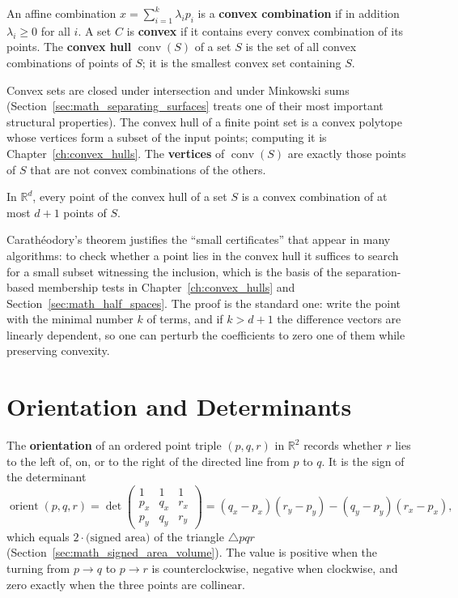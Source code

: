 \begin{definition}\label{def:math_convex_hull}
  An affine combination $x = \sum_{i=1}^k \lambda_i p_i$ is a
  \textbf{convex combination} if in addition $\lambda_i \ge 0$ for all $i$.
  A set $C$ is \textbf{convex} if it contains every convex combination of its
  points. The \textbf{convex hull} $\operatorname{conv}(S)$ of a set $S$ is
  the set of all convex combinations of points of $S$; it is the smallest
  convex set containing $S$.
\end{definition}

Convex sets are closed under intersection and under Minkowski sums
(Section~\ref{sec:math_separating_surfaces} treats one of their most
important structural properties). The convex hull of a finite point set is a
convex polytope whose vertices form a subset of the input points; computing
it is Chapter~\ref{ch:convex_hulls}. The \textbf{vertices} of
$\operatorname{conv}(S)$ are exactly those points of $S$ that are not convex
combinations of the others.

\begin{theorem}\label{thm:math_caratheodory}
  In $\mathbb{R}^d$, every point of the convex hull of a set $S$ is a convex
  combination of at most $d+1$ points of $S$.
\end{theorem}

Carath\'eodory's theorem justifies the ``small certificates'' that appear in
many algorithms: to check whether a point lies in the convex hull it suffices
to search for a small subset witnessing the inclusion, which is the basis of
the separation-based membership tests in Chapter~\ref{ch:convex_hulls} and
Section~\ref{sec:math_half_spaces}. The proof is the standard one: write the
point with the minimal number $k$ of terms, and if $k > d+1$ the difference
vectors are linearly dependent, so one can perturb the coefficients to zero
one of them while preserving convexity.


\section{Orientation and Determinants}
\label{sec:math_orientation_determinants}

The \textbf{orientation} of an ordered point triple $(p,q,r)$ in
$\mathbb{R}^2$ records whether $r$ lies to the left of, on, or to the right
of the directed line from $p$ to $q$. It is the sign of the determinant
\[
  \operatorname{orient}(p,q,r) =
  \det\begin{pmatrix}
    1 & 1 & 1\\
    p_x & q_x & r_x\\
    p_y & q_y & r_y
  \end{pmatrix}
  = (q_x - p_x)(r_y - p_y) - (q_y - p_y)(r_x - p_x),
\]
which equals $2 \cdot \text{(signed area)}$ of the triangle $\triangle pqr$
(Section~\ref{sec:math_signed_area_volume}). The value is positive when the
turning from $p\to q$ to $p\to r$ is counterclockwise, negative when
clockwise, and zero exactly when the three points are collinear.

